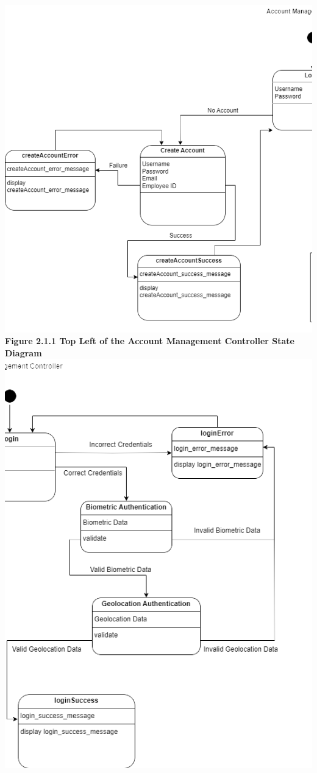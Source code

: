 \documentclass[]{article}
\begin{document}
\begin{center}
	\includegraphics{../images/ControllerStateDiagrams/AMCTopLeft.png}
	\textbf{Figure 2.1.1 Top Left of the Account Management Controller State Diagram}
	\includegraphics{../images/ControllerStateDiagrams/AMCTopRight.png}\\

\end{center}
\end{document}
